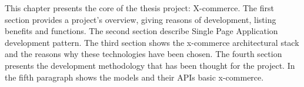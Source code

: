 This chapter presents the core of the thesis project: X-commerce.
The first section provides a project’s overview, giving reasons of development, listing benefits and functions. The second section describe Single Page Application development pattern. The third section shows the x-commerce architectural stack and the reasons why these technologies have been chosen. The fourth section presents the development methodology that has been thought for the project. In the fifth paragraph shows the models and their APIs basic x-commerce.